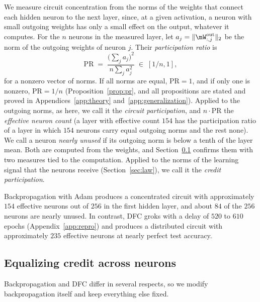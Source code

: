 \documentclass{article} %
\begin{document}
We measure circuit concentration from the norms of the weights that connect each hidden neuron to the next layer, since, at a given activation, a neuron with small outgoing weights has only a small effect on the output, whatever it computes. For the $n$ neurons in the measured layer, let $a_j = \|\mW^{\mathrm{out}}_{:,j}\|_2$ be the norm of the outgoing weights of neuron $j$. Their \emph{participation ratio} is
\begin{equation}
\mathrm{PR} \;=\; \frac{\big(\sum_j a_j\big)^2}{n \sum_j a_j^2} \;\in\; [1/n, 1],
\label{eq:pr}
\end{equation}
for a nonzero vector of norms. If all norms are equal, $\mathrm{PR} = 1$, and if only one is nonzero, $\mathrm{PR} = 1/n$ (Proposition~\ref{prop:pr}, and all propositions are stated and proved in Appendices~\ref{app:theory} and~\ref{app:generalization}). Applied to the outgoing norms, as here, we call it the \emph{circuit participation}, and $n \cdot \mathrm{PR}$ the \emph{effective neuron count} (a layer with effective count $154$ has the participation ratio of a layer in which $154$ neurons carry equal outgoing norms and the rest none). We call a neuron \emph{nearly unused} if its outgoing norm is below a tenth of the layer mean. Both are computed from the weights, and Section~\ref{sec:rules} confirms them with two measures tied to the computation. Applied to the norms of the learning signal that the neurons receive (Section~\ref{sec:law}), we call it the \emph{credit participation}.

Backpropagation with Adam produces a concentrated circuit with approximately $154$ effective neurons out of $256$ in the first hidden layer, and about $84$ of the $256$ neurons are nearly unused. In contrast, DFC groks with a delay of $520$ to $610$ epochs (Appendix~\ref{app:repro}) and produces a distributed circuit with approximately $235$ effective neurons at nearly perfect test accuracy.

\subsection{Equalizing credit across neurons}
\label{sec:rules}

Backpropagation and DFC differ in several respects, so we modify backpropagation itself and keep everything else fixed.
\end{document}
